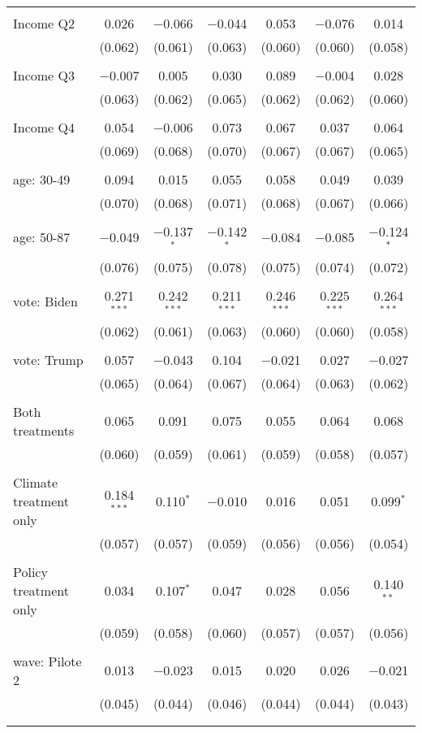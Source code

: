 \begin{tabular}{@{\extracolsep{5pt}}lcccccc}
  & & & & & & \\ 
 Income Q2 & 0.026 & $-$0.066 & $-$0.044 & 0.053 & $-$0.076 & 0.014 \\ 
  & (0.062) & (0.061) & (0.063) & (0.060) & (0.060) & (0.058) \\ 
  & & & & & & \\ 
 Income Q3 & $-$0.007 & 0.005 & 0.030 & 0.089 & $-$0.004 & 0.028 \\ 
  & (0.063) & (0.062) & (0.065) & (0.062) & (0.062) & (0.060) \\ 
  & & & & & & \\ 
 Income Q4 & 0.054 & $-$0.006 & 0.073 & 0.067 & 0.037 & 0.064 \\ 
  & (0.069) & (0.068) & (0.070) & (0.067) & (0.067) & (0.065) \\ 
  & & & & & & \\ 
 age: 30-49 & 0.094 & 0.015 & 0.055 & 0.058 & 0.049 & 0.039 \\ 
  & (0.070) & (0.068) & (0.071) & (0.068) & (0.067) & (0.066) \\ 
  & & & & & & \\ 
 age: 50-87 & $-$0.049 & $-$0.137$^{*}$ & $-$0.142$^{*}$ & $-$0.084 & $-$0.085 & $-$0.124$^{*}$ \\ 
  & (0.076) & (0.075) & (0.078) & (0.075) & (0.074) & (0.072) \\ 
  & & & & & & \\ 
 vote: Biden & 0.271$^{***}$ & 0.242$^{***}$ & 0.211$^{***}$ & 0.246$^{***}$ & 0.225$^{***}$ & 0.264$^{***}$ \\ 
  & (0.062) & (0.061) & (0.063) & (0.060) & (0.060) & (0.058) \\ 
  & & & & & & \\ 
 vote: Trump & 0.057 & $-$0.043 & 0.104 & $-$0.021 & 0.027 & $-$0.027 \\ 
  & (0.065) & (0.064) & (0.067) & (0.064) & (0.063) & (0.062) \\ 
  & & & & & & \\ 
 Both treatments & 0.065 & 0.091 & 0.075 & 0.055 & 0.064 & 0.068 \\ 
  & (0.060) & (0.059) & (0.061) & (0.059) & (0.058) & (0.057) \\ 
  & & & & & & \\ 
 Climate treatment only & 0.184$^{***}$ & 0.110$^{*}$ & $-$0.010 & 0.016 & 0.051 & 0.099$^{*}$ \\ 
  & (0.057) & (0.057) & (0.059) & (0.056) & (0.056) & (0.054) \\ 
  & & & & & & \\ 
 Policy treatment only & 0.034 & 0.107$^{*}$ & 0.047 & 0.028 & 0.056 & 0.140$^{**}$ \\ 
  & (0.059) & (0.058) & (0.060) & (0.057) & (0.057) & (0.056) \\ 
  & & & & & & \\ 
 wave: Pilote 2 & 0.013 & $-$0.023 & 0.015 & 0.020 & 0.026 & $-$0.021 \\ 
  & (0.045) & (0.044) & (0.046) & (0.044) & (0.044) & (0.043) \\ 
  & & & & & & \\ 
\hline \\[-1.8ex] 


\end{tabular}
